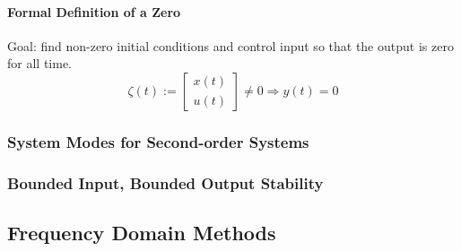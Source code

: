 \documentclass[../notes.tex]{subfiles}
\begin{document}
\paragraph{Formal Definition of a Zero}
Goal: find non-zero initial conditions and control input so that the output is zero for all time.
\begin{equation*}
    \zeta (t) := \begin{bmatrix}
        x(t) \\ u(t)
    \end{bmatrix} \neq 0 \Rightarrow y(t) = 0
\end{equation*}

\subsubsection{System Modes for Second-order Systems}
\subsubsection{Bounded Input, Bounded Output Stability}

\subsection{Frequency Domain Methods}
\end{document}

